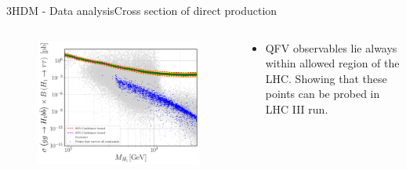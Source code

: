 \documentclass[10pt,xcolor=dvipsnames,mathserif]{beamer}
\begin{document}
\begin{frame}{3HDM - Data analysis}{Cross section of direct production}
\begin{columns}
    \begin{column}{0.49\textwidth}
    \begin{figure}[htb!]
    \centering
    \includegraphics[width=.8\textwidth]{Images/3HDM/Xsec/Xsec_3_Grey_Thight.pdf}
    \end{figure}	
    \end{column}
    \begin{column}{0.49\textwidth}
    \vskip2mm
    \begin{itemize}
        \item QFV observables lie always within allowed region of the LHC. Showing that these points can be probed in LHC III run.
    \end{itemize}
    \end{column}
\end{columns} 
\end{frame}
\end{document}
